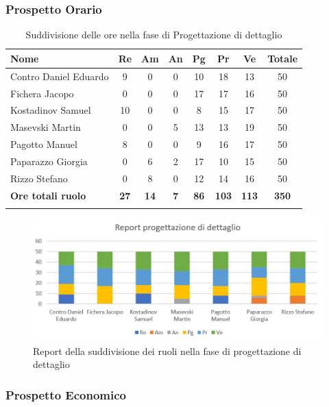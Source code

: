 \documentclass[../piano_di_progetto.tex]{subfiles}
\begin{document}
\subsubsection{Prospetto Orario}

\begin{center}
	\begin{longtable}{|l|c|c|c|c|c|c|c|}
		\hline
		\rowcolor{lightgray}
		\textbf{Nome} & \textbf{Re} & \textbf{Am} & \textbf{An} & \textbf{Pg}  & \textbf{Pr}   & \textbf{Ve} & \textbf{Totale} \\

		\hline
			Contro Daniel Eduardo & 9 & 0 & 0 & 10 & 18 & 13 & 50 \\
			Fichera Jacopo & 0 & 0 & 0 & 17 & 17 & 16 & 50 \\
			Kostadinov Samuel & 10 & 0 & 0 & 8 & 15 & 17 & 50 \\			
			Masevski Martin & 0 & 0 & 5 & 13 & 13 & 19 & 50 \\
			Pagotto Manuel & 8 & 0 & 0 & 9 & 16 & 17 & 50 \\		
			Paparazzo Giorgia & 0 & 6 & 2 & 17 & 10 & 15 & 50 \\
			Rizzo Stefano & 0 & 8 & 0 & 12 & 14 & 16 & 50 \\
			\hline
			\textbf{Ore totali ruolo} & \textbf{27} & \textbf{14} & \textbf{7} & \textbf{86} & \textbf{103} & \textbf{113} & \textbf{350} \\
		\hline	
		\rowcolor{white}
		\caption{Suddivisione delle ore nella fase di Progettazione di dettaglio}
	\end{longtable}
\end{center}

\begin{figure}[H]
\centering
\includegraphics[width=12cm]{src/img/report/report_prog_dett}
\caption{Report della suddivisione dei ruoli nella fase di progettazione di dettaglio}
\end{figure}

\subsubsection{Prospetto Economico}
\end{document}
